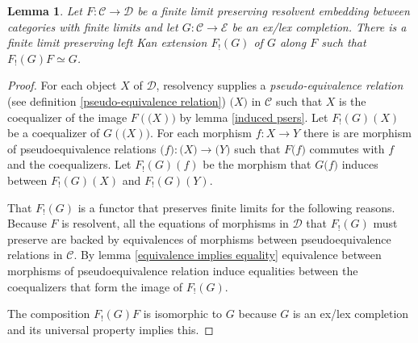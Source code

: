 \documentclass[sort&compress,draft]{elsarticle}
\theoremstyle{plain}
\newtheorem{lemma}[theorem]{Lemma}
\theoremstyle{definition}
\theoremstyle{remark}
\newcommand\cat\mathcal
\newcommand\of:
\newcommand\di{_!}
\begin{document}
\begin{lemma} Let $F\of\cat C\to\cat D$ be a finite limit preserving resolvent embedding between categories with finite limits and let $G\of\cat C\to\cat E$ be an ex/lex completion. There is a finite limit preserving left Kan extension $F\di(G)$ of $G$ along $F$ such that $F\di(G)F\simeq G$.\label{lex ex}\end{lemma}

\newcommand\pser\mathbf
\begin{proof} For each object $X$ of $\cat D$, resolvency supplies a \emph{pseudo-equivalence relation} (see definition \ref{pseudo-equivalence relation}) $\pser(X)$ in $\cat C$ such that $X$ is the coequalizer of the image $F(\pser(X))$ by lemma \ref{induced psers}. Let $F\di(G)(X)$ be a coequalizer of $G(\pser(X))$. For each morphism $f\of X\to Y$ there is are morphism of pseudoequivalence relations $\pser(f)\of\pser(X)\to\pser(Y)$ such that $F\pser(f)$ commutes with $f$ and the coequalizers. Let $F\di(G)(f)$ be the morphism that $G\pser(f)$ induces between $F\di(G)(X)$ and $F\di(G)(Y)$.

That $F\di(G)$ is a functor that preserves finite limits for the following reasons. Because $F$ is resolvent, all the equations of morphisms in $\cat D$ that $F\di(G)$ must preserve are backed by equivalences of morphisms between pseudoequivalence relations in $\cat C$. By lemma \ref{equivalence implies equality} equivalence between morphisms of pseudoequivalence relation induce equalities between the coequalizers that form the image of $F\di(G)$.

The composition $F\di(G)F$ is isomorphic to $G$ because $G$ is an ex/lex completion and its universal property implies this.
\end{proof}
\end{document}
